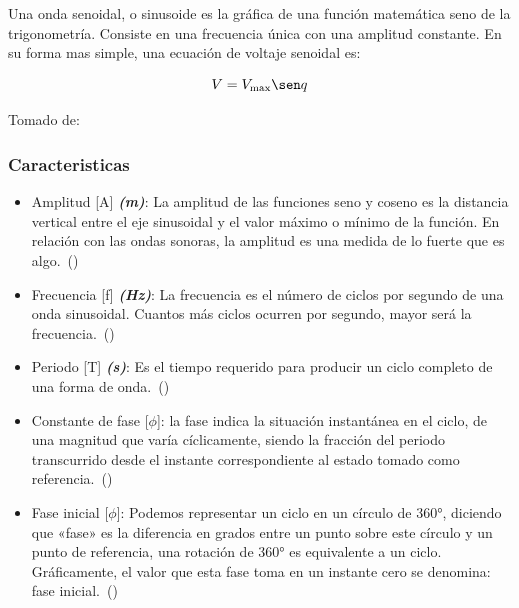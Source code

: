 \documentclass[twocolumn, 12pt]{article}
\newcommand{\bolditalic}[1]{\textbf{\textit{#1}}}
\begin{document}
Una onda senoidal, o sinusoide es la gráfica de una función
matemática seno de la trigonometría. Consiste en una
frecuencia única con una amplitud constante. En su forma
mas simple, una ecuación de voltaje senoidal es:

\begin{equation*}
    V = V_{\max} \sen q
\end{equation*}

Tomado de:~\cite{onda-senoidal}

\subsubsection{Caracteristicas}

\begin{itemize}[label=$\triangleright$]
    \item Amplitud [A] \bolditalic{(m)}: La amplitud de las funciones
          seno y coseno es la distancia vertical entre el eje
          sinusoidal y el valor máximo o mínimo de la función. En
          relación con las ondas sonoras, la amplitud es una medida
          de lo fuerte que es algo.~(\cite{onda-amplitud})

    \item Frecuencia [f] \bolditalic{(Hz)}: La frecuencia es el
          número de ciclos por segundo de una onda sinusoidal.
          Cuantos más ciclos ocurren por segundo, mayor será la
          frecuencia.~(\cite{fluke})

    \item Periodo [T] \bolditalic{(s)}: Es el tiempo requerido para
          producir un ciclo completo de una forma de
          onda.~(\cite{fluke})

    \item Constante de fase [$\phi$]: la fase indica la situación
          instantánea en el ciclo, de una magnitud que varía
          cíclicamente, siendo la fracción del periodo transcurrido
          desde el instante correspondiente al estado tomado como
          referencia.~(\cite{fase})

    \item Fase inicial [$\phi$]: Podemos representar un ciclo en un
          círculo de 360°, diciendo que «fase» es la diferencia en
          grados entre un punto sobre este círculo y un punto de
          referencia, una rotación de 360° es equivalente a un ciclo.
          Gráficamente, el valor que esta fase toma en un instante
          cero se denomina: fase inicial.~(\cite{fase})


\end{itemize}
\end{document}
